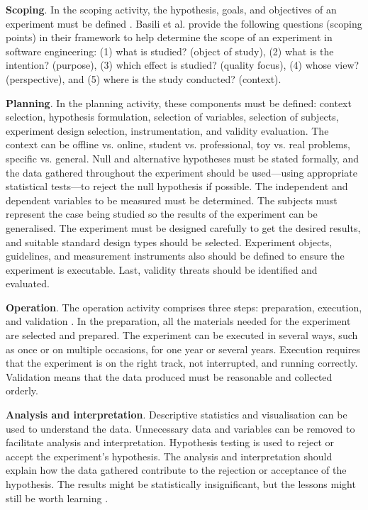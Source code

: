 \textbf{Scoping}. In the scoping activity, the hypothesis, goals, and objectives of an experiment must be defined \cite{DBLP:books/daglib/0029933/Wohlin}. Basili et al. \cite{basili1988tame} provide the following questions (scoping points) in their framework to help determine the scope of an experiment in software engineering: (1) what is studied? (object of study), (2) what is the intention? (purpose), (3) which effect is studied? (quality focus), (4) whose view? (perspective), and (5) where is the study conducted? (context).

\textbf{Planning}. In the planning activity, these components must be defined: context selection, hypothesis formulation, selection of variables, selection of subjects, experiment design selection, instrumentation, and validity evaluation\cite{DBLP:books/daglib/0029933/Wohlin}. The context can be offline vs. online, student vs. professional, toy vs. real problems, specific vs. general. Null and alternative hypotheses must be stated formally, and the data gathered throughout the experiment should be used—using appropriate statistical tests—to reject the null hypothesis if possible. The independent and dependent variables to be measured must be determined. The subjects must represent the case being studied so the results of the experiment can be generalised. The experiment must be designed carefully to get the desired results, and suitable standard design types should be selected. Experiment objects, guidelines, and measurement instruments also should be defined to ensure the experiment is executable. Last, validity threats should be identified and evaluated.

\textbf{Operation}. The operation activity comprises three steps: preparation, execution, and validation \cite{DBLP:books/daglib/0029933/Wohlin}.
In the preparation, all the materials needed for the experiment are selected and prepared. The experiment can be executed in several ways, such as once or on multiple occasions, for one year or several years. Execution requires that the experiment is on the right track, not interrupted, and running correctly. Validation means that the data produced must be reasonable and collected orderly.

\textbf{Analysis and interpretation}.
Descriptive statistics and visualisation can be used to understand the data. Unnecessary data and variables can be removed to facilitate analysis and interpretation. Hypothesis testing is used to reject or accept the experiment’s hypothesis. The analysis and interpretation should explain how the data gathered contribute to the rejection or acceptance of the hypothesis. The results might be statistically insignificant, but the lessons might still be worth learning \cite{DBLP:books/daglib/0029933/Wohlin}.


